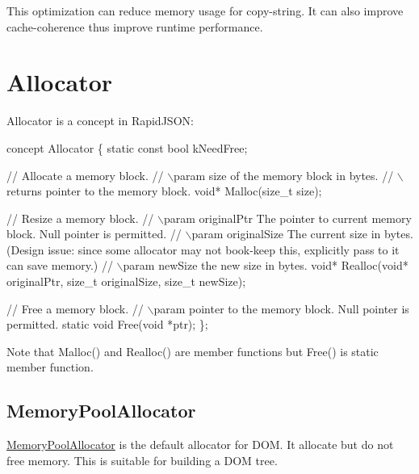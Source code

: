 This optimization can reduce memory usage for copy-\/string. It can also improve cache-\/coherence thus improve runtime performance.\hypertarget{md_Cadriciel_Commun_Externe_RapidJSON_doc_internals_Allocator}{}\section{Allocator}\label{md_Cadriciel_Commun_Externe_RapidJSON_doc_internals_Allocator}
{\ttfamily Allocator} is a concept in Rapid\+J\+S\+ON\+: 
\begin{DoxyCode}
concept Allocator \{
    \textcolor{keyword}{static} \textcolor{keyword}{const} \textcolor{keywordtype}{bool} kNeedFree;    

    \textcolor{comment}{// Allocate a memory block.}
    \textcolor{comment}{// \(\backslash\)param size of the memory block in bytes.}
    \textcolor{comment}{// \(\backslash\)returns pointer to the memory block.}
    \textcolor{keywordtype}{void}* Malloc(\textcolor{keywordtype}{size\_t} size);

    \textcolor{comment}{// Resize a memory block.}
    \textcolor{comment}{// \(\backslash\)param originalPtr The pointer to current memory block. Null pointer is permitted.}
    \textcolor{comment}{// \(\backslash\)param originalSize The current size in bytes. (Design issue: since some allocator may not book-keep
       this, explicitly pass to it can save memory.)}
    \textcolor{comment}{// \(\backslash\)param newSize the new size in bytes.}
    \textcolor{keywordtype}{void}* Realloc(\textcolor{keywordtype}{void}* originalPtr, \textcolor{keywordtype}{size\_t} originalSize, \textcolor{keywordtype}{size\_t} newSize);

    \textcolor{comment}{// Free a memory block.}
    \textcolor{comment}{// \(\backslash\)param pointer to the memory block. Null pointer is permitted.}
    \textcolor{keyword}{static} \textcolor{keywordtype}{void} Free(\textcolor{keywordtype}{void} *ptr);
\};
\end{DoxyCode}


Note that {\ttfamily Malloc()} and {\ttfamily Realloc()} are member functions but {\ttfamily Free()} is static member function.\hypertarget{md_Cadriciel_Commun_Externe_RapidJSON_doc_internals_MemoryPoolAllocator}{}\subsection{Memory\+Pool\+Allocator}\label{md_Cadriciel_Commun_Externe_RapidJSON_doc_internals_MemoryPoolAllocator}
{\ttfamily \hyperlink{class_memory_pool_allocator}{Memory\+Pool\+Allocator}} is the default allocator for D\+OM. It allocate but do not free memory. This is suitable for building a D\+OM tree.

